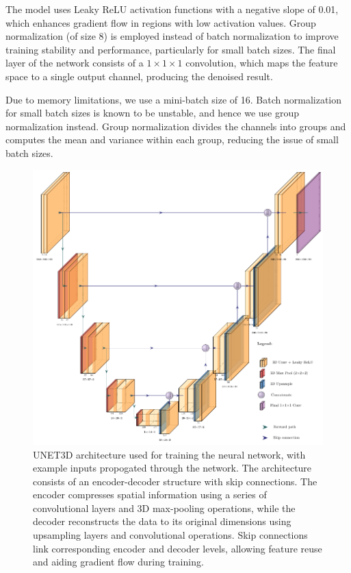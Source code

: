 The model uses Leaky ReLU activation functions with a negative slope of 0.01, which enhances gradient flow in regions with low activation values. Group normalization (of size 8) is employed instead of batch normalization to improve training stability and performance, particularly for small batch sizes. The final layer of the network consists of a $1 \times 1 \times 1$ convolution, which maps the feature space to a single output channel, producing the denoised result.

Due to memory limitations, we use a mini-batch size of \num{16}. Batch normalization for small batch sizes is known to be unstable, and hence we use group normalization \cite{wuGroupNormalization2018} instead. Group normalization divides the channels into groups and computes the mean and variance within each group, reducing the issue of small batch sizes.

\begin{figure}[h]
    \centering
    \includegraphics[width=1\linewidth]{images/unet_architecture.pdf}
    \caption{UNET3D architecture used for training the neural network, with example inputs propogated through the network. The architecture consists of an encoder-decoder structure with skip connections. The encoder compresses spatial information using a series of convolutional layers and 3D max-pooling operations, while the decoder reconstructs the data to its original dimensions using upsampling layers and convolutional operations. Skip connections link corresponding encoder and decoder levels, allowing feature reuse and aiding gradient flow during training.}
    \label{fig:unet-architecture}
\end{figure}

